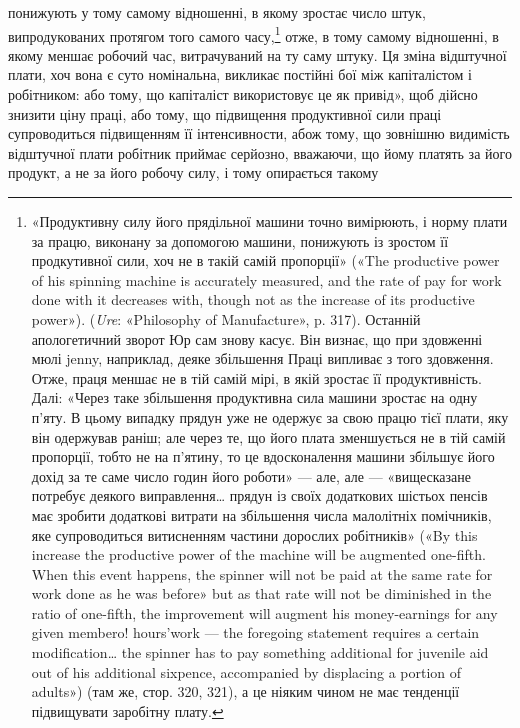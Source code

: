 \parcont{}  %
понижують у тому самому відношенні, в якому зростає число
штук, випродукованих протягом того самого часу,\footnote{
«Продуктивну силу його прядільної машини точно вимірюють,
і норму плати за працю, виконану за допомогою машини, понижують
із зростом її продкутивної сили, хоч не в такій самій пропорції» («The
productive power of his spinning machine is accurately measured, and the
rate of pay for work done with it decreases with, though not as the increase
of its productive power»). (\emph{Ure}: «Philosophy of Manufacture», p. 317).
Останній апологетичний зворот Юр сам знову касує. Він визнає, що при
здовженні мюлі jenny, наприклад, деяке збільшення Праці випливає
з того здовження. Отже, праця меншає не в тій самій мірі, в якій зростає
її продуктивність. Далі: «Через таке збільшення продуктивна сила машини
зростає на одну п’яту. В цьому випадку прядун уже не одержує
за свою працю тієї плати, яку він одержував раніш; але через те, що його
плата зменшується не в тій самій пропорції, тобто не на п’ятину, то це
вдосконалення машини збільшує його дохід за те саме число годин його
роботи» — але, але — «вищесказане потребує деякого виправлення\dots{}
прядун із своїх додаткових шістьох пенсів має зробити додаткові витрати
на збільшення числа малолітніх помічників, яке супроводиться витисненням
частини дорослих робітників» («By this increase the productive power
of the machine will be augmented one-fifth. When this event happens,
the spinner will not be paid at the same rate for work done as he was before»
but as that rate will not be diminished in the ratio of one-fifth, the improvement
will augment his money-earnings for any given membero! hours’work
— the foregoing statement requires a certain modification\dots{} the spinner
has to pay something additional for juvenile aid out of his additional
sixpence, accompanied by displacing a portion of adults») (там же, стор. 320,
321), а це ніяким чином не має тенденції підвищувати заробітну плату.
} отже, в тому
самому відношенні, в якому меншає робочий час, витрачуваний
на ту саму штуку. Ця зміна відштучної плати, хоч вона є суто
номінальна, викликає постійні бої між капіталістом і робітником:
або тому, що капіталіст використовує це як привід»,
щоб дійсно знизити ціну праці, або тому, що підвищення продуктивної
сили праці супроводиться підвищенням її інтенсивности,
абож тому, що зовнішню видимість відштучної плати
робітник приймає серйозно, вважаючи, що йому платять за його
продукт, а не за його робочу силу, і тому опирається такому
